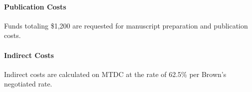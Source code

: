 \documentclass[10pt,letterpaper]{article}
\begin{document}
\paragraph{Publication Costs}
Funds totaling \$1,200 are requested for manuscript preparation and publication costs.

\paragraph{Indirect Costs}
Indirect costs are calculated on MTDC at the rate of 62.5\% per Brown's negotiated rate.
\end{document}
